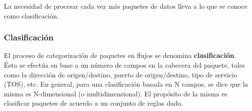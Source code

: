 La necesidad de procesar cada vez más paquetes de datos lleva a lo que se conoce como clasificación.

\subsubsection{Clasificación}
El proceso de categorización de paquetes en flujos se denomina \textbf{clasificación}. Ésta se efectúa en base a un número de campos en la cabecera del paquete, tales como la dirección de origen/destino, puerto de origen/destino, tipo de servicio (TOS), etc. En general, para una clasificación basada en N campos, se dice que la misma es N-dimensional (o multidimensional). El propósito de la misma es clasificar paquetes de acuerdo a un conjunto de reglas dado.


